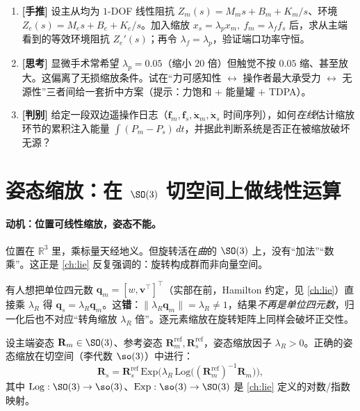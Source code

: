 \begin{practice}
\begin{enumerate}
  \item \textbf{[手推]} 设主从均为 $1$-DOF 线性阻抗 $Z_m(s)=M_m s+B_m+K_m/s$、环境 $Z_e(s)=M_e s+B_e+K_e/s$。加入缩放 $x_s=\lambda_p x_m,\ f_m=\lambda_f f_s$ 后，求从主端看到的等效环境阻抗 $Z_e'(s)$；再令 $\lambda_f=\lambda_p$，验证端口功率守恒。
  \item \textbf{[思考]} 显微手术常希望 $\lambda_p=0.05$（缩小 $20$ 倍）但触觉不按 $0.05$ 缩、甚至放大。这偏离了无损缩放条件。试在“力可感知性 $\leftrightarrow$ 操作者最大承受力 $\leftrightarrow$ 无源性”三者间给一套折中方案（提示：力饱和 $+$ 能量罐 $+$ TDPA）。
  \item \textbf{[判别]} 给定一段双边遥操作日志（$\mathbf{f}_m,\mathbf{f}_s,\dot{\mathbf{x}}_m,\dot{\mathbf{x}}_s$ 时间序列），如何\emph{在线}估计缩放环节的累积注入能量 $\int(P_m-P_s)\,dt$，并据此判断系统是否正在被缩放破坏无源？
\end{enumerate}
\end{practice}

\section{姿态缩放：在 \texorpdfstring{$\SO(3)$}{SO(3)} 切空间上做线性运算}
\label{sec:tm-attitude}

\paragraph{动机：位置可线性缩放，姿态不能。}
位置在 $\mathbb{R}^3$ 里，乘标量天经地义。但旋转活在\emph{曲}的 $\SO(3)$ 上，没有“加法”“数乘”。这正是 \cref{ch:lie} 反复强调的：旋转构成群而非向量空间。

\begin{pitfall}[陷阱：四元数分量线性缩放]
有人想把单位四元数 $\mathbf{q}_m=[w,\mathbf{v}^\top]^\top$（实部在前，Hamilton 约定，见 \cref{ch:lie}）直接乘 $\lambda_R$ 得 $\mathbf{q}_s=\lambda_R\mathbf{q}_m$。这\textbf{错}：$\|\lambda_R\mathbf{q}_m\|=\lambda_R\neq 1$，结果\emph{不再是单位四元数}，归一化后也不对应“转角缩放 $\lambda_R$ 倍”。逐元素缩放在旋转矩阵上同样会破坏正交性。
\end{pitfall}

\begin{definition}[$\SO(3)$ 上的姿态缩放]\label{def:tm-att-scale}
设主端姿态 $\mathbf{R}_m\in\SO(3)$、参考姿态 $\mathbf{R}_m^{\text{ref}},\mathbf{R}_s^{\text{ref}}$，姿态缩放因子 $\lambda_R>0$。正确的姿态缩放在切空间（李代数 $\so(3)$）中进行：
\begin{equation}
  \mathbf{R}_s=\mathbf{R}_s^{\text{ref}}\,\mathrm{Exp}\!\Big(\lambda_R\,\mathrm{Log}\big((\mathbf{R}_m^{\text{ref}})^{-1}\mathbf{R}_m\big)\Big),
  \label{eq:tm-att-scale}
\end{equation}
其中 $\mathrm{Log}:\SO(3)\to\so(3)$、$\mathrm{Exp}:\so(3)\to\SO(3)$ 是 \cref{ch:lie} 定义的对数/指数映射。
\end{definition}

